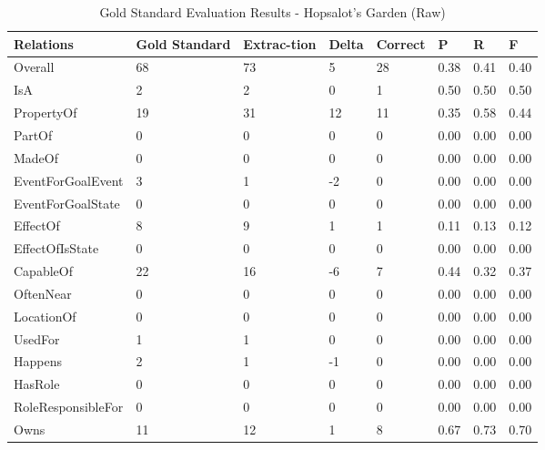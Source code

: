 \begin{table}[H]   %
\centering
\caption{Gold Standard Evaluation Results - Hopsalot's Garden (Raw)} \vspace{0.25em}
\begin{tabular}{|p{3.5cm}|p{2cm}|p{1.5cm}|p{1cm}|p{1.5cm}|p{1cm}|p{1cm}|p{1cm}|} \hline
\textbf{Relations} & \textbf{Gold Standard} & \textbf{Extrac-tion} & \textbf{Delta} & \textbf{Correct} & \textbf{P} & \textbf{R} & \textbf{F} \\ \hline
Overall & 68 & 73 & 5 & 28 & 0.38 & 0.41 & 0.40 \\ \hline
IsA & 2 & 2 & 0 & 1 & 0.50 & 0.50 & 0.50 \\ \hline
PropertyOf & 19 & 31 & 12 & 11 & 0.35 & 0.58 & 0.44 \\ \hline
PartOf  & 0 & 0 & 0 & 0 & 0.00 & 0.00 & 0.00 \\ \hline
MadeOf & 0 & 0 & 0 & 0 & 0.00 & 0.00 & 0.00 \\ \hline
EventForGoalEvent & 3 & 1 & -2 & 0 & 0.00 & 0.00 & 0.00 \\ \hline
EventForGoalState & 0 & 0 & 0 & 0 & 0.00 & 0.00 & 0.00 \\ \hline
EffectOf & 8 & 9 & 1 & 1 & 0.11 & 0.13 & 0.12 \\ \hline
EffectOfIsState & 0 & 0 & 0 & 0 & 0.00 & 0.00 & 0.00 \\ \hline
CapableOf & 22 & 16 & -6 & 7 & 0.44 & 0.32 & 0.37 \\ \hline
OftenNear & 0 & 0 & 0 & 0 & 0.00 & 0.00 & 0.00 \\ \hline
LocationOf & 0 & 0 & 0 & 0 & 0.00 & 0.00 & 0.00 \\ \hline
UsedFor & 1 & 1 & 0 & 0 & 0.00 & 0.00 & 0.00 \\ \hline
Happens & 2 & 1 & -1 & 0 & 0.00 & 0.00 & 0.00 \\ \hline
HasRole & 0 & 0 & 0 & 0 & 0.00 & 0.00 & 0.00 \\ \hline
RoleResponsibleFor & 0 & 0 & 0 & 0 & 0.00 & 0.00 & 0.00 \\ \hline
Owns & 11 & 12 & 1 & 8 & 0.67 & 0.73 & 0.70 \\ \hline
\end{tabular}
\label{tab:gold3}
\end{table}

